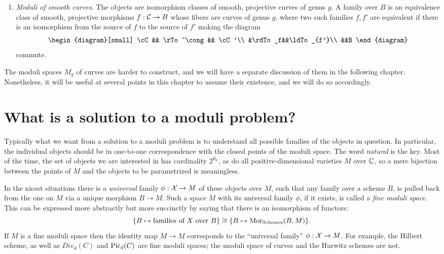 \begin{enumerate}
\item \emph{Moduli of smooth curves}. The objects are isomorphism classes of smooth, projective curves of genus $g$. A family over $B$ is an equivalence class of smooth, projective morphisms $f : \mathcal C \to B$ whose fibers are curves of genus $g$, where two such families $f, f'$
are equivalent if there is an isomorphism from the source of $f$ to the source
of $f'$ making the diagram
$$
\begin{diagram}[small]
\cC && \rTo^\cong && \cC'\\
&\rdTo_f&&\ldTo_{f'}\\
&&B
\end{diagram}
$$
commute.
\end{enumerate}

The moduli spaces $M_g$ of curves are harder to construct, and we will have a separate discussion of them in the following chapter. Nonetheless, it will be useful at several points in this chapter to assume their existence, and we will do so accordingly.


\section{What is a solution to a moduli problem?}

Typically what we want from a solution to a moduli problem is to understand all possible families of the objects
in question. In particular, the individual objects should be in one-to-one correspondence with the closed points of the
moduli space.  The word \emph{natural} is the key. Most of the time, the set of objects we are interested in has cardinality $2^{\aleph_0}$, as do all positive-dimensional varieties $M$ over ${\mathbb C}$, so a mere  bijection between the points of $M$ and the objects to be parametrized is meaningless.

In the nicest situations there is a \emph{universal} family $\phi: {\mathcal X}\to M$ of these objects over $M$,
such that any family over a scheme $B$,  is pulled back from the one on $M$ via a unique morphism $B\to M.$  Such a space $M$ with its universal family $\phi$, if it exists, is called a \emph{fine moduli space}. This can be expressed more abstractly but more succinctly by saying that there is an isomorphism of functors:
$$
\{ B \mapsto \text{families of } X \text{ over } B \} \cong \{ B\mapsto {\rm{Mor}}_{{\rm Schemes}}(B, M) \}.
$$
If $M$ is a fine moduli space then the identity map $M\to M$ corresponds to the ``universal family'' $\phi: {\mathcal X} \to M$. 
For example, the Hilbert scheme, as well as $Div_d(C)$ and $\operatorname{Pic}_d(C)$ are fine moduli spaces; the moduli space of curves
and the Hurwitz schemes are not.

